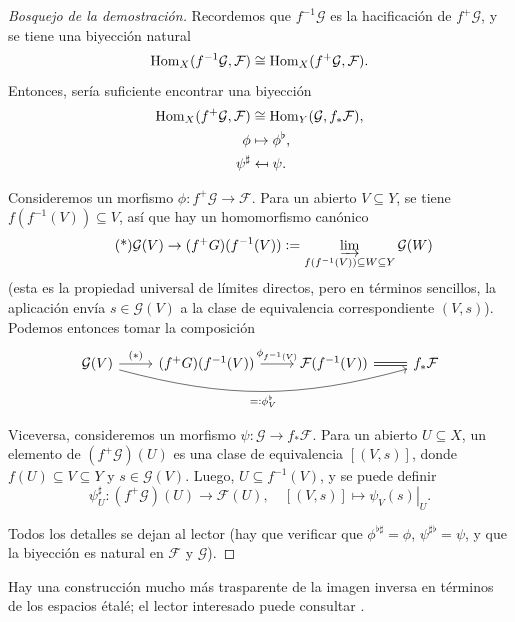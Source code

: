 \documentclass{article}
\numberwithin{equation}{section}
\theoremstyle{definition}
\begin{document}
\begin{proof}[Bosquejo de la demostración]
  Recordemos que $f^{-1} \mathcal{G}$ es la hacificación de $f^+ \mathcal {G}$,
  y se tiene una biyección natural
  \[ \operatorname{Hom}_X (f^{-1} \mathcal{G}, \mathcal{F}) \cong
     \operatorname{Hom}_X (f^+ \mathcal{G}, \mathcal{F}). \]
  Entonces, sería suficiente encontrar una biyección
  \begin{align*}
    \operatorname{Hom}_X (f^+ \mathcal{G}, \mathcal{F}) & \cong \operatorname{Hom}_Y (\mathcal{G}, f_* \mathcal{F}),\\
    \phi & \mapsto \phi^\flat,\\
    \psi^\sharp & \mapsfrom \psi.
  \end{align*}

  Consideremos un morfismo $\phi\colon f^+ \mathcal{G} \to \mathcal{F}$. Para
  un abierto $V \subseteq Y$, se tiene $f (f^{-1} (V)) \subseteq V$, así que hay
  un homomorfismo canónico
  \[ \tag{*} \mathcal{G} (V) \to (f^+ G) (f^{-1} (V)) \mathrel{\mathop:}=
     \varinjlim_{f (f^{-1} (V)) \subseteq W \subseteq Y} \mathcal{G} (W) \]
  (esta es la propiedad universal de límites directos, pero en términos
  sencillos, la aplicación envía $s \in \mathcal{G} (V)$ a la clase de
  equivalencia correspondiente $(V,s)$). Podemos entonces tomar la composición
  \[ \begin{tikzcd}
      \mathcal{G} (V) \ar{r}{(*)}\ar[bend right=15]{rrr}[swap]{\rdfn \phi^\flat_V} & (f^+ G) (f^{-1} (V)) \ar{r}{\phi_{f^{-1} (V)}} & \mathcal{F} (f^{-1} (V)) \ar[equals]{r} & f_* \mathcal{F}
    \end{tikzcd} \]

  Viceversa, consideremos un morfismo
  $\psi\colon \mathcal{G} \to f_* \mathcal{F}$. Para un abierto $U \subseteq X$,
  un elemento de $(f^+ \mathcal{G}) (U)$ es una clase de equivalencia $[(V,s)]$,
  donde $f (U) \subseteq V \subseteq Y$ y $s \in \mathcal{G} (V)$. Luego,
  $U \subseteq f^{-1} (V)$, y se puede definir
  \[ \psi^\sharp_U\colon (f^+ \mathcal{G}) (U) \to \mathcal{F} (U), \quad
     [(V,s)] \mapsto \left.\psi_V (s)\right|_U. \]

  Todos los detalles se dejan al lector (hay que verificar que
  $\phi^{\flat\sharp} = \phi$, $\psi^{\sharp\flat} = \psi$, y que la biyección
  es natural en $\mathcal{F}$ y $\mathcal{G}$).
\end{proof}

Hay una construcción mucho más trasparente de la imagen inversa en términos
de los espacios étalé; el lector interesado puede consultar
\cite[Chapter II]{MacLane-Moerdijk}.
\end{document}
